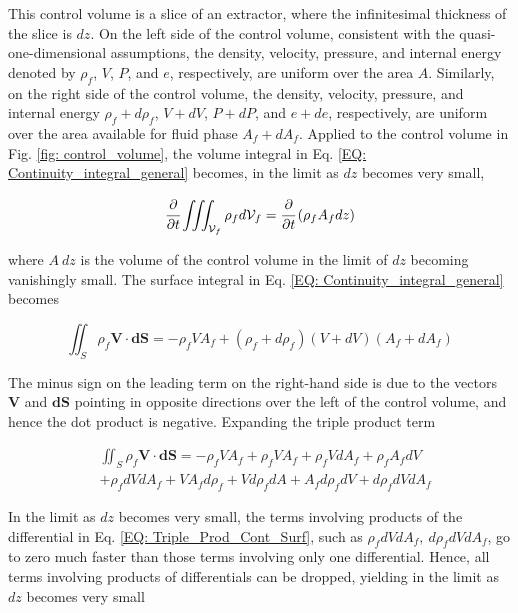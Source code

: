 \documentclass[../Article_Model_Parameters.tex]{subfiles}
\begin{document}
	This control volume is a slice of an extractor, where the infinitesimal thickness of the slice is $dz$. On the left side of the control volume, consistent with the quasi-one-dimensional assumptions, the density, velocity, pressure, and internal energy denoted by $\rho_f$, $V$, $P$, and $e$, respectively, are uniform over the area $A$. Similarly, on the right side of the control volume, the density, velocity, pressure, and internal energy $\rho_f+d\rho_f$, $V+dV$, $P+dP$, and $e+de$, respectively, are uniform over the area available for fluid phase $A_f+dA_f$. Applied to the control volume in Fig. \ref{fig: control_volume}, the volume integral in Eq. \ref{EQ: Continuity_integral_general} becomes, in the limit as $dz$ becomes very small,
	
	{\footnotesize
		\begin{equation}
			\cfrac{\partial}{\partial t} \iiint_{\mathcal{V}_f} \rho_f d\mathcal{V}_f = \cfrac{\partial}{\partial t}\left( \rho_f A_f dz \right)
			\label{EQ: Cont_Simpl_Vol}
		\end{equation}
	}

	where $A~dz$ is the volume of the control volume in the limit of $dz$ becoming vanishingly small. The surface integral in Eq. \ref{EQ: Continuity_integral_general} becomes
	
	{\footnotesize
		\begin{equation}
			\iint_S \rho_f \textbf{V} \cdot \textbf{dS} = -\rho_f V A_f + (\rho_f+d\rho_f)(V+dV)(A_f+dA_f)
		\end{equation}
	}

	The minus sign on the leading term on the right-hand side is due to the vectors $\textbf{V}$ and $\textbf{dS}$ pointing in opposite directions over the left of the control volume, and hence the dot product is negative. Expanding the triple product term 
	 
	{\footnotesize
		\begin{align}
			&\iint_S \rho_f \textbf{V} \cdot \textbf{dS} = -\rho_f V A_f + \rho_f V A_f + \rho_f V dA_f + \rho_f A_f dV \nonumber \\ 
			&+ \rho_f dV dA_f + V A_f d\rho_f + V d\rho_f dA + A_f d\rho_f dV + d\rho_f dV dA_f
			\label{EQ: Triple_Prod_Cont_Surf}
		\end{align}
	}
	
	In the limit as $dz$ becomes very small, the terms involving products of the differential in Eq. \ref{EQ: Triple_Prod_Cont_Surf}, such as $\rho_f dV dA_f,~d\rho_f dV dA_f$, go to zero much faster than those terms involving only one differential. Hence, all terms involving products of differentials can be dropped, yielding in the limit as $dz$ becomes very small
	
\end{document}
